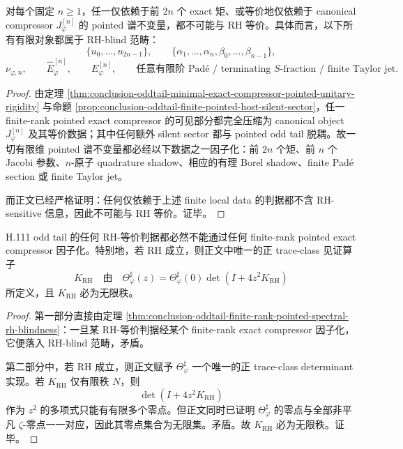 \begin{theorem}\label{thm:conclusion-oddtail-finite-rank-pointed-spectral-rh-blindness}
对每个固定 \(n\ge 1\)，任一仅依赖于前 \(2n\) 个 exact 矩、或等价地仅依赖于 canonical compressor \(J_\varphi^{[n]}\) 的 pointed 谱不变量，都不可能与 RH 等价。具体而言，以下所有有限对象都属于 RH-blind 范畴：
\[
\{u_0,\dots,u_{2n-1}\},
\qquad
\{\alpha_1,\dots,\alpha_n,\beta_0,\dots,\beta_{n-1}\},
\]
\[
\nu_{\varphi,n},
\qquad
\widehat E_\varphi^{[n]},
\qquad
E_\varphi^{[n]},
\qquad
\text{任意有限阶 Pad\'e / terminating \(S\)-fraction / finite Taylor jet}.
\]
\end{theorem}
\begin{proof}
由定理 \ref{thm:conclusion-oddtail-minimal-exact-compressor-pointed-unitary-rigidity} 与命题 \ref{prop:conclusion-oddtail-finite-pointed-host-silent-sector}，任一 finite-rank pointed exact compressor 的可见部分都完全压缩为 canonical object \(J_\varphi^{[n]}\) 及其等价数据；其中任何额外 silent sector 都与 pointed odd tail 脱耦。故一切有限维 pointed 谱不变量都必经以下数据之一因子化：前 \(2n\) 个矩、前 \(n\) 个 Jacobi 参数、\(n\)-原子 quadrature shadow、相应的有理 Borel shadow、finite Pad\'e section 或 finite Taylor jet。

而正文已经严格证明：任何仅依赖于上述 finite local data 的判据都不含 RH-sensitive 信息，因此不可能与 RH 等价。证毕。
\end{proof}

\begin{theorem}[算术敏感性的无限秩阈值]\label{thm:conclusion-oddtail-arithmetic-sensitivity-infinite-rank-threshold}
H.111 odd tail 的任何 RH-等价判据都必然不能通过任何 finite-rank pointed exact compressor 因子化。特别地，若 RH 成立，则正文中唯一的正 trace-class 见证算子
\[
K_{\mathrm{RH}}
\quad\text{由}\quad
\Theta_\varphi^\sharp(z)=\Theta_\varphi^\sharp(0)\det(I+4z^2K_{\mathrm{RH}})
\]
所定义，且 \(K_{\mathrm{RH}}\) 必为无限秩。
\end{theorem}
\begin{proof}
第一部分直接由定理 \ref{thm:conclusion-oddtail-finite-rank-pointed-spectral-rh-blindness}：一旦某 RH-等价判据经某个 finite-rank exact compressor 因子化，它便落入 RH-blind 范畴，矛盾。

第二部分中，若 RH 成立，则正文赋予 \(\Theta_\varphi^\sharp\) 一个唯一的正 trace-class determinant 实现。若 \(K_{\mathrm{RH}}\) 仅有限秩 \(N\)，则
\[
\det(I+4z^2K_{\mathrm{RH}})
\]
作为 \(z^2\) 的多项式只能有有限多个零点。但正文同时已证明 \(\Theta_\varphi^\sharp\) 的零点与全部非平凡 \(\zeta\)-零点一一对应，因此其零点集合为无限集。矛盾。故 \(K_{\mathrm{RH}}\) 必为无限秩。证毕。
\end{proof}

